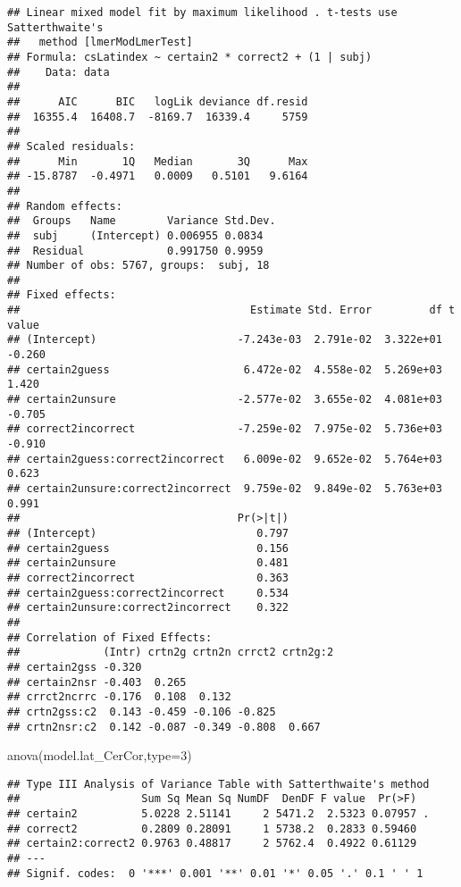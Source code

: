 \documentclass[
]{article}
\newenvironment{Shaded}{\begin{snugshade}}{\end{snugshade}}
\newcommand{\AttributeTok}[1]{\textcolor[rgb]{0.77,0.63,0.00}{#1}}
\newcommand{\DecValTok}[1]{\textcolor[rgb]{0.00,0.00,0.81}{#1}}
\newcommand{\FunctionTok}[1]{\textcolor[rgb]{0.00,0.00,0.00}{#1}}
\newcommand{\NormalTok}[1]{#1}
\begin{document}
\begin{verbatim}
## Linear mixed model fit by maximum likelihood . t-tests use Satterthwaite's
##   method [lmerModLmerTest]
## Formula: csLatindex ~ certain2 * correct2 + (1 | subj)
##    Data: data
## 
##      AIC      BIC   logLik deviance df.resid 
##  16355.4  16408.7  -8169.7  16339.4     5759 
## 
## Scaled residuals: 
##      Min       1Q   Median       3Q      Max 
## -15.8787  -0.4971   0.0009   0.5101   9.6164 
## 
## Random effects:
##  Groups   Name        Variance Std.Dev.
##  subj     (Intercept) 0.006955 0.0834  
##  Residual             0.991750 0.9959  
## Number of obs: 5767, groups:  subj, 18
## 
## Fixed effects:
##                                    Estimate Std. Error         df t value
## (Intercept)                      -7.243e-03  2.791e-02  3.322e+01  -0.260
## certain2guess                     6.472e-02  4.558e-02  5.269e+03   1.420
## certain2unsure                   -2.577e-02  3.655e-02  4.081e+03  -0.705
## correct2incorrect                -7.259e-02  7.975e-02  5.736e+03  -0.910
## certain2guess:correct2incorrect   6.009e-02  9.652e-02  5.764e+03   0.623
## certain2unsure:correct2incorrect  9.759e-02  9.849e-02  5.763e+03   0.991
##                                  Pr(>|t|)
## (Intercept)                         0.797
## certain2guess                       0.156
## certain2unsure                      0.481
## correct2incorrect                   0.363
## certain2guess:correct2incorrect     0.534
## certain2unsure:correct2incorrect    0.322
## 
## Correlation of Fixed Effects:
##             (Intr) crtn2g crtn2n crrct2 crtn2g:2
## certain2gss -0.320                              
## certain2nsr -0.403  0.265                       
## crrct2ncrrc -0.176  0.108  0.132                
## crtn2gss:c2  0.143 -0.459 -0.106 -0.825         
## crtn2nsr:c2  0.142 -0.087 -0.349 -0.808  0.667
\end{verbatim}

\begin{Shaded}
\begin{Highlighting}[]
\FunctionTok{anova}\NormalTok{(model.lat\_CerCor,}\AttributeTok{type=}\DecValTok{3}\NormalTok{)}
\end{Highlighting}
\end{Shaded}

\begin{verbatim}
## Type III Analysis of Variance Table with Satterthwaite's method
##                   Sum Sq Mean Sq NumDF  DenDF F value  Pr(>F)  
## certain2          5.0228 2.51141     2 5471.2  2.5323 0.07957 .
## correct2          0.2809 0.28091     1 5738.2  0.2833 0.59460  
## certain2:correct2 0.9763 0.48817     2 5762.4  0.4922 0.61129  
## ---
## Signif. codes:  0 '***' 0.001 '**' 0.01 '*' 0.05 '.' 0.1 ' ' 1
\end{verbatim}
\end{document}
